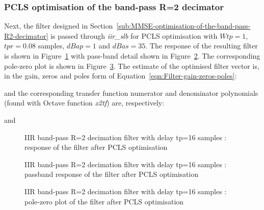 \documentclass[a4paper,twoside,10pt,english]{report}
\begin{document}
\subsubsection{PCLS optimisation of the band-pass R=2 decimator}
Next, the filter designed in 
Section~\ref{sub:MMSE-optimisation-of-the-band-pass-R2-decimator} is passed 
through \emph{iir\_slb} for PCLS optimisation with $Wtp=1$, $tpr=0.08$ samples, 
$dBap=1$ and $dBas=35$. The response of the resulting filter is shown 
in Figure~\ref{fig:iir-sqp-slb-bandpass-test-pcls-d1} with pass-band detail
shown in Figure~\ref{fig:iir-sqp-slb-bandpass-test-pcls-d1-passband}. The
corresponding pole-zero plot is shown in
Figure~\ref{fig:iir-sqp-slb-bandpass-test-pcls-d1-pz}. The estimate of the
optimised filter vector is, in the gain, zeros and poles form of
Equation~\ref{eqn:Filter-gain-zeros-poles}:
\begin{small}

\end{small}
and the corresponding transfer function numerator and denominator polynomials
(found with Octave function \emph{x2tf}) are, respectively:
\begin{small}

\end{small}
and
\begin{small}

\end{small}
\begin{figure}[!htbp]
\begin{center}
\scalebox{0.7}{}
\caption{IIR band-pass R=2 decimation filter with delay tp=16 samples : response of the filter after PCLS optimisation}
\label{fig:iir-sqp-slb-bandpass-test-pcls-d1}
\end{center}
\end{figure}
\begin{figure}[!htbp]
\begin{center}
\scalebox{0.7}{}
\caption{IIR band-pass R=2 decimation filter with delay tp=16 samples : passband response of the filter after PCLS optimisation}
\label{fig:iir-sqp-slb-bandpass-test-pcls-d1-passband}
\end{center}
\end{figure}
\begin{figure}[!htbp]
\begin{center}
\scalebox{0.7}{}
\caption{IIR band-pass R=2 decimation filter with delay tp=16 samples : pole-zero plot of the filter after PCLS optimisation}
\label{fig:iir-sqp-slb-bandpass-test-pcls-d1-pz}
\end{center}
\end{figure}
\clearpage
\end{document}
